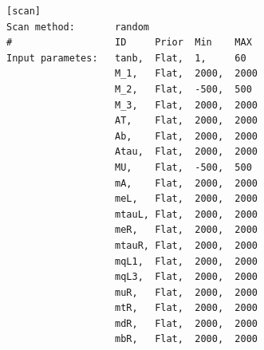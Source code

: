 \documentclass{article}
\begin{document}
\begin{listing}[H]
	\begin{verbatim}
[scan]
Scan method:       random
#                  ID     Prior  Min    MAX
Input parametes:   tanb,  Flat,  1,     60
                   M_1,   Flat,  2000,  2000
                   M_2,   Flat,  -500,  500
                   M_3,   Flat,  2000,  2000
                   AT,    Flat,  2000,  2000
                   Ab,    Flat,  2000,  2000
                   Atau,  Flat,  2000,  2000
                   MU,    Flat,  -500,  500
                   mA,    Flat,  2000,  2000
                   meL,   Flat,  2000,  2000
                   mtauL, Flat,  2000,  2000
                   meR,   Flat,  2000,  2000
                   mtauR, Flat,  2000,  2000
                   mqL1,  Flat,  2000,  2000
                   mqL3,  Flat,  2000,  2000
                   muR,   Flat,  2000,  2000
                   mtR,   Flat,  2000,  2000
                   mdR,   Flat,  2000,  2000
                   mbR,   Flat,  2000,  2000
  \end{verbatim}
	\caption{A portion of the \texttt{easyscan.ini} configuration defining the random sampling for the electroweakinos scan.}
	\label{lst:easyscanini}
\end{listing}
\end{document}
